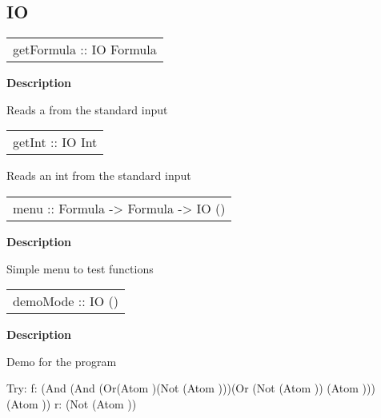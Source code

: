 \subsection{IO}
\begin{haddockdesc}
\item[\begin{tabular}{@{}l}
getFormula :: IO Formula
\end{tabular}]
{\haddockbegindoc
\textbf{Description}\par
Reads a  from the standard input\par}
\end{haddockdesc}
\begin{haddockdesc}
\item[\begin{tabular}{@{}l}
getInt :: IO Int
\end{tabular}]
{\haddockbegindoc
Reads an int from the standard input\par}
\end{haddockdesc}
\begin{haddockdesc}
\item[\begin{tabular}{@{}l}
menu :: Formula -> Formula -> IO ()
\end{tabular}]
{\haddockbegindoc
\textbf{Description}\par
Simple menu to test functions\par}
\end{haddockdesc}
\begin{haddockdesc}
\item[\begin{tabular}{@{}l}
demoMode :: IO ()
\end{tabular}]
{\haddockbegindoc
\textbf{Description}\par
Demo for the program\par
Try:
f: (And (And (Or(Atom )(Not (Atom )))(Or (Not (Atom )) (Atom ))) (Atom ))
r: (Not (Atom ))\par}
\end{haddockdesc}